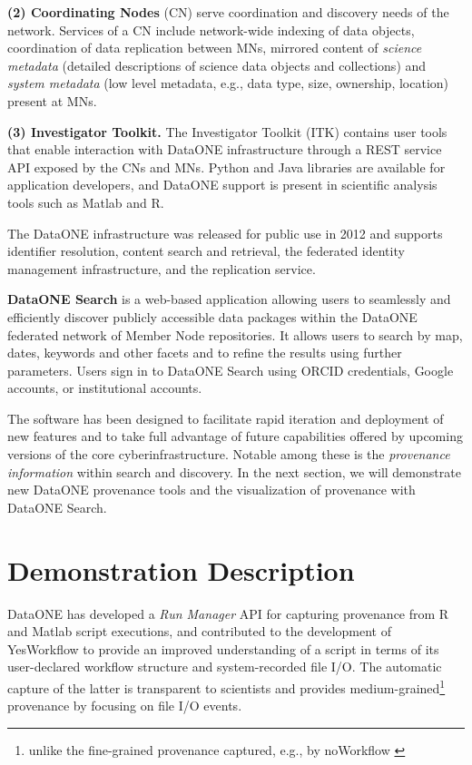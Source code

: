 \documentclass[a4paper]{llncs}
\newcommand{\mypara}[1]{\vspace{4pt}\noindent\textbf{#1}}
\begin{document}
\mypara{(2) Coordinating Nodes} (CN) serve coordination and discovery needs of the network. Services of a CN include network-wide indexing of data objects, coordination of data replication between MNs, mirrored content of \emph{science metadata} (detailed descriptions of science data objects and collections) and \emph{system metadata} (low level metadata, e.g., data type, size, ownership, location) present at MNs.


\mypara{(3) Investigator Toolkit.} The Investigator Toolkit (ITK) contains user tools that enable interaction with DataONE infrastructure through a REST service API exposed by the CNs and MNs. Python and Java libraries are available for application developers, and DataONE support is present in scientific analysis tools such as Matlab and R.


The DataONE infrastructure was released for public use in 2012 and supports identifier resolution, content search and retrieval, the federated identity management infrastructure, and the replication service.


\mypara{DataONE Search} is a web-based application allowing users to seamlessly and efficiently discover publicly accessible data packages within the DataONE federated network of Member Node repositories. It allows users to search by map, dates, keywords and other facets and to refine the results using further parameters. Users sign in to DataONE Search using ORCID credentials, Google accounts, or institutional accounts.

The software has been designed to facilitate rapid iteration and deployment of new features and to take full advantage of future capabilities offered by upcoming versions of the core cyberinfrastructure. Notable among these is the \emph{provenance information} within search and discovery. In the next section, we will demonstrate new DataONE provenance tools and the visualization of provenance with DataONE Search.


\section{Demonstration Description}  \label{demo}

DataONE has developed a \emph{Run Manager} API for capturing provenance from R \cite{recordr} and Matlab \cite{matlabdataone} script executions, and contributed to the development of YesWorkflow \cite{yesworkflow} to provide an improved understanding of a script in terms of its user-declared workflow structure and system-recorded file I/O. The automatic capture of the latter is transparent to scientists and provides medium-grained\footnote{unlike the fine-grained provenance captured, e.g., by noWorkflow \cite{nw14}} provenance by focusing on file I/O events.
\end{document}
